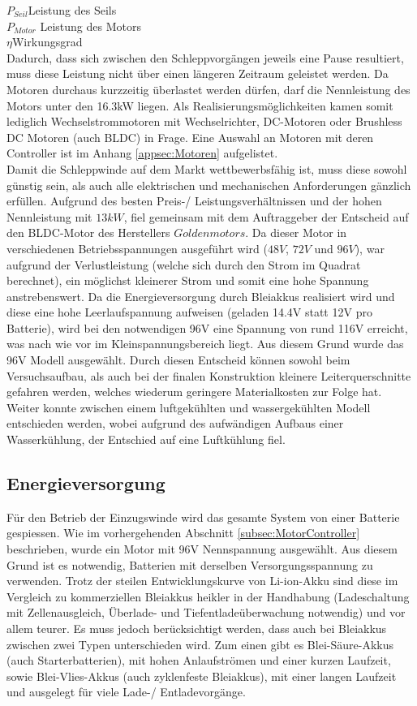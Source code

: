 $ P_{Seil} $\quad 	Leistung des Seils     \\
$ P_{Motor} $  Leistung des Motors    \\
$ \eta $\qquad  Wirkungsgrad     \\

Dadurch, dass sich zwischen den Schleppvorgängen jeweils eine Pause resultiert, muss diese Leistung nicht über einen längeren Zeitraum geleistet werden. Da Motoren durchaus kurzzeitig überlastet werden dürfen, darf die Nennleistung des Motors unter den 16.3kW liegen. Als Realisierungsmöglichkeiten kamen somit lediglich Wechselstrommotoren mit Wechselrichter, DC-Motoren oder Brushless DC Motoren (auch BLDC) in Frage. Eine Auswahl an Motoren mit deren Controller ist im Anhang \ref{appsec:Motoren} aufgelistet.\\
Damit die Schleppwinde auf dem Markt wettbewerbsfähig ist, muss diese sowohl günstig sein, als auch alle elektrischen und mechanischen Anforderungen gänzlich erfüllen. Aufgrund des besten Preis-/ Leistungsverhältnissen und der hohen Nennleistung mit $ 13kW $, fiel gemeinsam mit dem Auftraggeber der Entscheid auf den BLDC-Motor des Herstellers $ Goldenmotors $. Da dieser Motor in verschiedenen Betriebsspannungen ausgeführt wird ($ 48V $, $ 72V $ und $ 96V $), war aufgrund der Verlustleistung (welche sich durch den Strom im Quadrat berechnet), ein möglichst kleinerer Strom und somit eine hohe Spannung anstrebenswert. Da die Energieversorgung durch Bleiakkus realisiert wird und diese eine hohe Leerlaufspannung aufweisen (geladen 14.4V statt 12V pro Batterie), wird bei den notwendigen 96V eine Spannung von rund 116V erreicht, was nach wie vor im Kleinspannungsbereich liegt. Aus diesem Grund wurde das 96V Modell ausgewählt. Durch diesen Entscheid können sowohl beim Versuchsaufbau, als auch bei der finalen Konstruktion kleinere Leiterquerschnitte gefahren werden, welches wiederum geringere Materialkosten zur Folge hat. Weiter konnte zwischen einem luftgekühlten und wassergekühlten Modell entschieden werden, wobei aufgrund des aufwändigen Aufbaus einer Wasserkühlung, der Entschied auf eine Luftkühlung fiel.  


\subsection{Energieversorgung}\label{subsec:Energieversorgung}

Für den Betrieb der Einzugswinde wird das gesamte System von einer Batterie gespiessen. Wie im vorhergehenden Abschnitt \ref{subsec:MotorController} beschrieben, wurde ein Motor mit 96V Nennspannung ausgewählt. Aus diesem Grund ist es notwendig, Batterien mit derselben Versorgungsspannung zu verwenden. Trotz der steilen Entwicklungskurve von Li-ion-Akku sind diese im Vergleich zu kommerziellen Bleiakkus heikler in der Handhabung (Ladeschaltung mit Zellenausgleich, Überlade- und Tiefentladeüberwachung notwendig) und vor allem teurer. Es muss jedoch berücksichtigt werden, dass auch bei Bleiakkus zwischen zwei Typen unterschieden wird. Zum einen gibt es Blei-Säure-Akkus (auch Starterbatterien), mit hohen Anlaufströmen und einer kurzen Laufzeit, sowie Blei-Vlies-Akkus (auch zyklenfeste Bleiakkus), mit einer langen Laufzeit und ausgelegt für viele Lade-/ Entladevorgänge.

